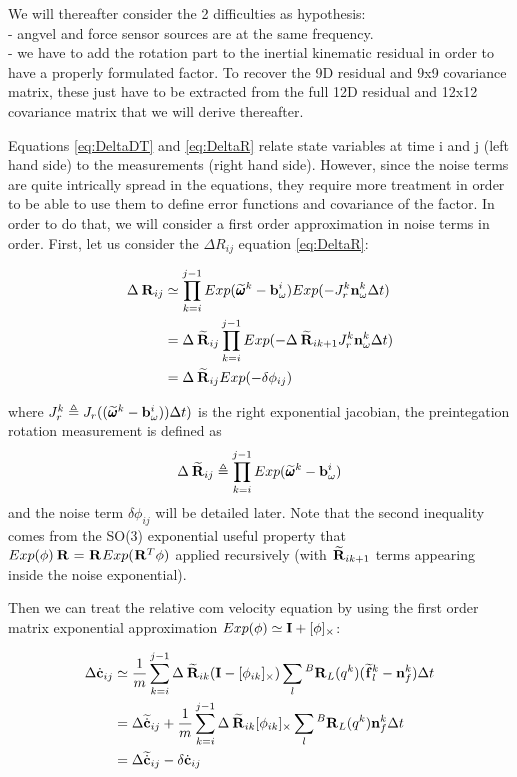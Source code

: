 \documentclass[11pt]{article}
\newcommand{\Rot}[2]{\prescript{#1}{}{\bfR}_{#2}}
\newcommand{\Rotm}[2]{\prescript{#1}{}{\widetilde{\bfR}}_{#2}}
\newcommand{\noise}{\bfn}
\newcommand{\bias}{\bfb}
\newcommand{\angvelm}[2]{\prescript{#1}{}{\widetilde{\pmb{\omega}}}_{#2}}
\newcommand{\forcem}[2]{\prescript{#1}{}{\widetilde{\bff}}_{#2}}
\newcommand{\COMd}{\dot{\bfc}}
\newcommand{\COMdm}{\widetilde{\dot{\bfc}}}
\newcommand{\Ident}{\bfI}
\begin{document}
We will thereafter consider the 2 difficulties as hypothesis: 
\\
- angvel and force sensor sources are at the same frequency. 
\\
- we have to add the rotation part to the inertial kinematic residual in order to have a properly formulated factor. To recover the 9D residual and 9x9 covariance matrix, these just have to be extracted from the full 12D residual and 12x12 covariance matrix that we will derive thereafter.


Equations \ref{eq:DeltaDT} and \ref{eq:DeltaR} relate state variables at time i and j (left hand side) to the measurements (right hand side). However, since the noise terms are quite intrically spread in the equations, they require more treatment in order to be able to use them to define error functions and covariance of the factor. In order to do that, we will consider a first order approximation in noise terms in order. First, let us consider the $\Delta R_{ij}$ equation \ref{eq:DeltaR}:

\begin{equation}
\begin{split}
\Delta \Rot{}{ij} &\simeq  \prod_{k=i}^{j-1} Exp(\angvelm{}{}^k - \bias_{\omega}^i) Exp(-J^k_r \noise_{\omega}^k\Delta t)
\\
&= \Delta \Rotm{}{ij}\prod_{k=i}^{j-1} Exp(- \Delta \Rotm{}{ik+1} J^k_r \noise_{\omega}^k\Delta t)
\\
&= \Delta \Rotm{}{ij}Exp(-\delta \phi_{ij})
\end{split}
\end{equation}

where $J^k_r \triangleq J_r((\angvelm{}{}^k - \bias_{\omega}^i))\Delta t)$ is the right exponential jacobian, the preintegation rotation measurement is defined as 
\begin{equation}
    \Delta \Rotm{}{ij} \triangleq \prod_{k=i}^{j-1} Exp(\angvelm{}{}^k - \bias_{\omega}^i)
\end{equation}
and the noise term $\delta \phi_{ij}$ will be detailed later. Note that the second inequality comes from the SO(3) exponential useful property that $ Exp(\phi)\Rot{}{} = \Rot{}{} Exp(\Rot{}{}^T \phi)$ applied recursively (with $\Rotm{}{ik+1}$ terms appearing inside the noise exponential).

Then we can treat the relative com velocity equation by using the first order matrix exponential approximation $Exp(\phi) \simeq \Ident + [\phi]_{\times}$:

\begin{equation}
\begin{split}
\Delta \COMd_{ij} &\simeq
\frac{1}{m} \sum_{k=i}^{j-1} \Delta \Rotm{}{ik}(\Ident - [\phi_{ik}]_{\times}) \sum_l \Rot{B}{L}(q^{k}) (\forcem{}{l}^{k} - \noise_f^{k}) \Delta t 
\\
&= \Delta \COMdm_{ij} + \frac{1}{m} \sum_{k=i}^{j-1} \Delta \Rotm{}{ik}[\phi_{ik}]_{\times} \sum_l \Rot{B}{L}(q^{k})\noise_f^{k} \Delta t
\\
&= \Delta \COMdm_{ij} - \delta \COMd_{ij}
\end{split}
\end{equation}
\end{document}
